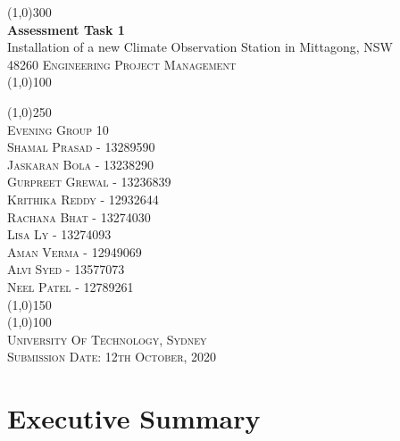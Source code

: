 \documentclass[a4paper]{article}
\begin{document}
\begin{titlepage}
	\begin{center}
	\line(1,0){300}\\
	\Huge{\bfseries Assessment Task 1}\\
	\huge{Installation of a new Climate Observation Station in Mittagong, NSW}\\ [0.3cm]
	\textsc{\huge 48260 Engineering Project Management}\\
	\line(1,0){100}\\
	[1cm]
	\end{center}
	\begin{flushright}
	\line(1,0){250}\\[0.2cm]

	\textsc{\LARGE Evening Group 10}\\[10pt]
	\textsc{\Large Shamal Prasad - 13289590}\\
	\textsc{\Large Jaskaran Bola - 13238290}\\
	\textsc{\Large Gurpreet Grewal - 13236839}\\
	\textsc{\Large Krithika Reddy - 12932644}\\
	\textsc{\Large Rachana Bhat - 13274030}\\
	\textsc{\Large Lisa Ly - 13274093}\\
	\textsc{\Large Aman Verma - 12949069}\\
	\textsc{\Large Alvi Syed - 13577073}\\
	\textsc{\Large Neel Patel - 12789261}\\[0.4cm]
	\line(1,0){150}\\
	\line(1,0){100}\\
	[0.75cm]
	\textsc{\LARGE University Of Technology, Sydney}\\
	\textsc{\Large Submission Date: 12th October, 2020}\\
	\end{flushright}
\end{titlepage}
\section{Executive Summary}
\tableofcontents
\thispagestyle{empty}

\listoftables
\thispagestyle{empty}

\listoffigures
\thispagestyle{empty}


\cleardoublepage



\setcounter{page}{1}
\end{document}
